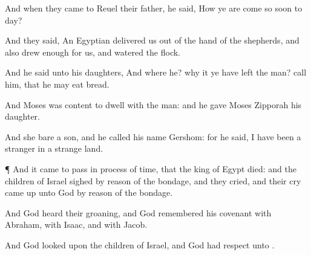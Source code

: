 {And when they
came to
Reuel their
father, he
said,
How
{} ye are
come so
soon to
day?

And they
said, An
Egyptian
delivered us out of the
hand of the
shepherds, and also
drew
{}
enough for us, and
watered the
flock.

And he
said unto his
daughters, And where
{} he? why
{} it
{} ye have
left the
man?
call him, that he may
eat
bread.

And
Moses was
content to
dwell with the
man: and he
gave
Moses
Zipporah his
daughter.

And she
bare
{} a
son, and he
called his
name
Gershom: for he
said, I have been a
stranger in a
strange
land.


\par }{\PP {}¶ And it came to pass in
process of
time, that the
king of
Egypt
died: and the
children of
Israel
sighed by reason
of the
bondage, and they
cried, and their
cry came
up unto
God by reason of the
bondage.

And
God
heard their
groaning, and
God
remembered his
covenant with
Abraham, with
Isaac, and with
Jacob.

And
God
looked upon the
children of
Israel, and
God had
respect unto
{}.




\par }
